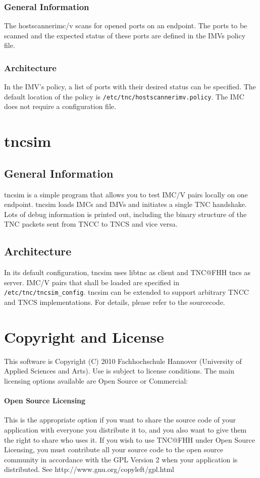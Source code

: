 \documentclass[a4paper,10pt]{scrartcl}
\begin{document}
\subsubsection{General Information}
The hostscannerimc/v scans for opened ports on an endpoint. The ports to be scanned and 
the expected status of these ports are defined in the IMVs policy file.

\subsubsection{Architecture}
In the IMV's policy, a list of ports with their desired status can be specified.
The default location of the policy is \texttt{/etc/tnc/hostscannerimv.policy}.
The IMC does not require a configuration file.


\section{tncsim}
\subsection{General Information}
tncsim is a simple program that allows you to test IMC/V pairs locally on one
endpoint. tncsim loads IMCs and IMVs and initiates a single TNC handshake. Lots
of debug information is printed out, including the binary structure of the TNC
packets sent from TNCC to TNCS and vice versa.

\subsection{Architecture}
In its default configuration, tncsim uses libtnc as client and TNC@FHH tncs
as server. IMC/V pairs that shall be loaded are specified in \texttt{/etc/tnc/tncsim\_config}.
tncsim can be extended to support arbitrary TNCC and TNCS implementations. For
details, please refer to the sourcecode.

\section{Copyright and License}
This software is Copyright (C) 2010
Fachhochschule Hannover (University of Applied Sciences and Arts).
Use is subject to license conditions.
The main licensing options available are Open Source or Commercial:

\paragraph{Open Source Licensing} This is the appropriate option if you want to
share the source code of your application with everyone you
distribute it to, and you also want to give them the right to share
who uses it. If you wish to use TNC@FHH under Open Source Licensing,
you must contribute all your source code to the open source
community in accordance with the GPL Version 2 when your application
is distributed. See http://www.gnu.org/copyleft/gpl.html
\end{document}
